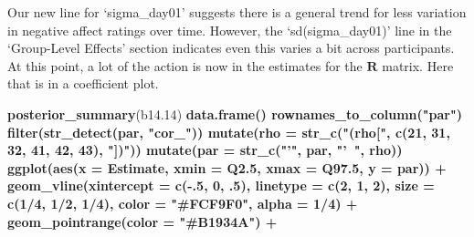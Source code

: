 \documentclass[]{article}
\newenvironment{Shaded}{\begin{snugshade}}{\end{snugshade}}
\newcommand{\DataTypeTok}[1]{\textcolor[rgb]{0.13,0.29,0.53}{#1}}
\newcommand{\DecValTok}[1]{\textcolor[rgb]{0.00,0.00,0.81}{#1}}
\newcommand{\FloatTok}[1]{\textcolor[rgb]{0.00,0.00,0.81}{#1}}
\newcommand{\KeywordTok}[1]{\textcolor[rgb]{0.13,0.29,0.53}{\textbf{#1}}}
\newcommand{\NormalTok}[1]{#1}
\newcommand{\OperatorTok}[1]{\textcolor[rgb]{0.81,0.36,0.00}{\textbf{#1}}}
\newcommand{\StringTok}[1]{\textcolor[rgb]{0.31,0.60,0.02}{#1}}
\begin{document}
Our new line for `sigma\_day01' suggests there is a general trend for
less variation in negative affect ratings over time. However, the
`sd(sigma\_day01)' line in the `Group-Level Effects' section indicates
even this varies a bit across participants. At this point, a lot of the
action is now in the estimates for the \(\mathbf R\) matrix. Here that
is in a coefficient plot.

\begin{Shaded}
\begin{Highlighting}[]
\KeywordTok{posterior_summary}\NormalTok{(b14}\FloatTok{.14}\NormalTok{) }\OperatorTok{%>%}\StringTok{ }
\StringTok{  }\KeywordTok{data.frame}\NormalTok{() }\OperatorTok{%>%}\StringTok{ }
\StringTok{  }\KeywordTok{rownames_to_column}\NormalTok{(}\StringTok{"par"}\NormalTok{) }\OperatorTok{%>%}\StringTok{ }
\StringTok{  }\KeywordTok{filter}\NormalTok{(}\KeywordTok{str_detect}\NormalTok{(par, }\StringTok{"cor_"}\NormalTok{)) }\OperatorTok{%>%}\StringTok{ }
\StringTok{  }\KeywordTok{mutate}\NormalTok{(}\DataTypeTok{rho =} \KeywordTok{str_c}\NormalTok{(}\StringTok{"(rho["}\NormalTok{, }\KeywordTok{c}\NormalTok{(}\DecValTok{21}\NormalTok{, }\DecValTok{31}\NormalTok{, }\DecValTok{32}\NormalTok{, }\DecValTok{41}\NormalTok{, }\DecValTok{42}\NormalTok{, }\DecValTok{43}\NormalTok{), }\StringTok{"])"}\NormalTok{)) }\OperatorTok{%>%}\StringTok{ }
\StringTok{  }\KeywordTok{mutate}\NormalTok{(}\DataTypeTok{par =} \KeywordTok{str_c}\NormalTok{(}\StringTok{"'"}\NormalTok{, par, }\StringTok{"'~"}\NormalTok{, rho)) }\OperatorTok{%>%}\StringTok{ }
\StringTok{  }
\StringTok{  }\KeywordTok{ggplot}\NormalTok{(}\KeywordTok{aes}\NormalTok{(}\DataTypeTok{x =}\NormalTok{ Estimate, }\DataTypeTok{xmin =}\NormalTok{ Q2}\FloatTok{.5}\NormalTok{, }\DataTypeTok{xmax =}\NormalTok{ Q97}\FloatTok{.5}\NormalTok{, }\DataTypeTok{y =}\NormalTok{ par)) }\OperatorTok{+}
\StringTok{  }\KeywordTok{geom_vline}\NormalTok{(}\DataTypeTok{xintercept =} \KeywordTok{c}\NormalTok{(}\OperatorTok{-}\NormalTok{.}\DecValTok{5}\NormalTok{, }\DecValTok{0}\NormalTok{, }\FloatTok{.5}\NormalTok{), }\DataTypeTok{linetype =} \KeywordTok{c}\NormalTok{(}\DecValTok{2}\NormalTok{, }\DecValTok{1}\NormalTok{, }\DecValTok{2}\NormalTok{), }\DataTypeTok{size =} \KeywordTok{c}\NormalTok{(}\DecValTok{1}\OperatorTok{/}\DecValTok{4}\NormalTok{, }\DecValTok{1}\OperatorTok{/}\DecValTok{2}\NormalTok{, }\DecValTok{1}\OperatorTok{/}\DecValTok{4}\NormalTok{), }\DataTypeTok{color =} \StringTok{"#FCF9F0"}\NormalTok{, }\DataTypeTok{alpha =} \DecValTok{1}\OperatorTok{/}\DecValTok{4}\NormalTok{) }\OperatorTok{+}
\StringTok{  }\KeywordTok{geom_pointrange}\NormalTok{(}\DataTypeTok{color =} \StringTok{"#B1934A"}\NormalTok{) }\OperatorTok{+}
}}}}}}
\end{Highlighting}
\end{Shaded}
\end{document}
